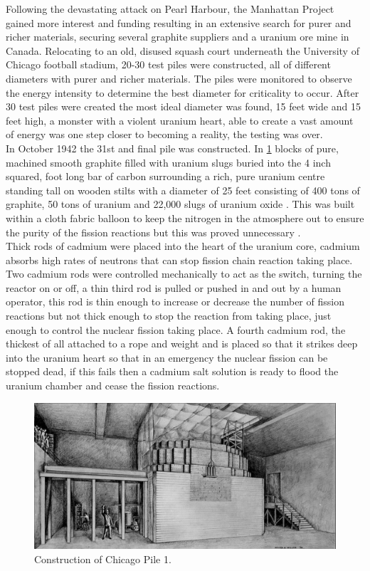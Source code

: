 \documentclass[11pt]{article}
\begin{document}
\begin{multicols}{2}
\noindent Following the devastating attack on Pearl Harbour, the Manhattan Project gained more interest and funding resulting in an extensive search for purer and richer materials, securing several graphite suppliers and a uranium ore mine in Canada. Relocating to an old, disused squash court underneath the University of Chicago football stadium, 20-30 test piles were constructed, all of different diameters with purer and richer materials. The piles were monitored to observe the energy intensity to determine the best diameter for criticality to occur. After 30 test piles were created the most ideal diameter was found, 15 feet wide and 15 feet high, a monster with a violent uranium heart, able to create a vast amount of energy was one step closer to becoming a reality, the testing was over. \\ 
\indent In October 1942 the 31st and final pile was constructed. In \cref{Chicago Pile 1} blocks of pure, machined smooth graphite filled with uranium slugs buried into the 4 inch squared, foot long bar of carbon surrounding a rich, pure uranium centre standing tall on wooden stilts with a diameter of 25 feet consisting of 400 tons of graphite, 50 tons of uranium and 22,000 slugs of uranium oxide \cite{Youtube}. This was built within a cloth fabric balloon to keep the nitrogen in the atmosphere out to ensure the purity of the fission reactions but this was proved unnecessary \cite{Fermi}. \\ 
\indent Thick rods of cadmium were placed into the heart of the uranium core, cadmium absorbs high rates of neutrons that can stop fission chain reaction taking place. Two cadmium rods were controlled mechanically to act as the switch, turning the reactor on or off, a thin third rod is pulled or pushed in and out by a human operator, this rod is thin enough to increase or decrease the number of fission reactions but not thick enough to stop the reaction from taking place, just enough to control the nuclear fission taking place. A fourth cadmium rod, the thickest of all attached to a rope and weight and is placed so that it strikes deep into the uranium heart so that in an emergency the nuclear fission can be stopped dead, if this fails then a cadmium salt solution is ready to flood the uranium chamber and cease the fission reactions. \\

\begin{figure}[H]
\centering
\includegraphics[scale=0.24]{Images/CP-1.png}
\caption{Construction of Chicago Pile 1. \cite{Picture}}
\label{Chicago Pile 1}
\end{figure} 


\end{multicols}
\end{document}
